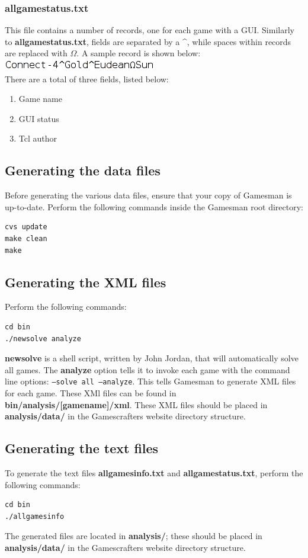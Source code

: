 \documentclass[11pt]{article}
\begin{document}
\subsubsection{allgamestatus.txt}
This file contains a number of records, one for each game with a GUI. Similarly to \textbf{allgamestatus.txt}, fields are separated by a \textbf{\^}, while spaces within records are replaced with $\Omega$. A sample record is shown below:
\\\includegraphics[scale=.5]{allgamestatus_record.png} 
\\There are a total of three fields, listed below:
\begin{enumerate}
\item Game name
\item GUI status
\item Tcl author
\end{enumerate}
\subsection{Generating the data files}
\label{generatingdata}
Before generating the various data files, ensure that your copy of Gamesman is up-to-date. Perform the following commands inside the Gamesman root directory:
\begin{verbatim}
cvs update
make clean
make
\end{verbatim}
\subsection{Generating the XML files}
Perform the following commands:
\begin{verbatim}
cd bin
./newsolve analyze
\end{verbatim}
\textbf{newsolve} is a shell script, written by John Jordan, that will automatically solve all games. The \textbf{analyze} option tells it to invoke each game with the command line options: \texttt{--solve all --analyze}. This tells Gamesman to generate XML files for each game. These XMl files can be found in \textbf{bin/analysis/[gamename]/xml}. These XML files should be placed in \textbf{analysis/data/} in the Gamescrafters website directory structure.
\subsection{Generating the text files}
\label{generatingtext}
To generate the text files \textbf{allgamesinfo.txt} and \textbf{allgamestatus.txt}, perform the following commands:
\begin{verbatim}
cd bin
./allgamesinfo
\end{verbatim}
The generated files are located in \textbf{analysis/}; these should be placed in \textbf{analysis/data/} in the Gamescrafters website directory structure.
\end{document}
